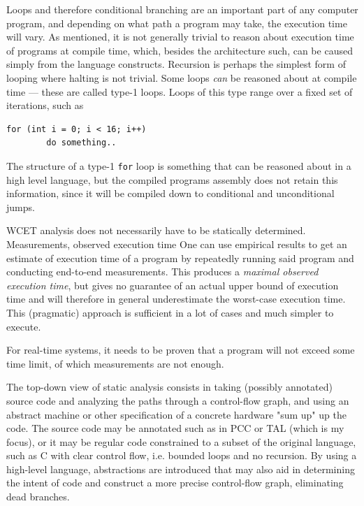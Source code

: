 Loops and therefore conditional branching are an important part of any computer
program, and depending on what path a program may take, the execution time will
vary.
As mentioned, it is not generally trivial to reason about execution time of
programs at compile time, which, besides the architecture such, can be caused
simply from the language constructs.
Recursion is perhaps the simplest form of looping where halting is not trivial.
Some loops \emph{can} be reasoned about at compile time --- these are called
type-1 loops\cite{pldi}.
Loops of this type range over a fixed set of iterations, such as
\begin{lstlisting}
for (int i = 0; i < 16; i++)
        do something..
\end{lstlisting}
The structure of a type-1 \texttt{for} loop is something that can be reasoned
about in a high level language, but the compiled programs assembly does not
retain this information, since it will be compiled down to conditional and
unconditional jumps.

WCET analysis does not necessarily have to be statically determined.
Measurements, observed execution time
One can use empirical results to get an estimate of execution time of a program
by repeatedly running said program and conducting end-to-end measurements.
This produces a \textit{maximal observed execution time}, but gives no
guarantee of an actual upper bound of execution time and will therefore in
general underestimate the worst-case execution time\cite{wcet}.
This (pragmatic) approach is sufficient in a lot of cases and much simpler to
execute.

For real-time systems, it needs to be proven that a program will not exceed
some time limit, of which measurements are not enough. 

The top-down view of static analysis consists in taking (possibly annotated)
source code and analyzing the paths through a control-flow graph, and using an
abstract machine or other specification of a concrete hardware "sum up" up the
code.
The source code may be annotated such as in PCC\cite{attpl} or
TAL\cite{tal-toplas} (which is my focus), or it may be regular code\cite{p10}
constrained to a subset of the original language, such as C with clear control
flow, i.e. bounded loops and no recursion.
By using a high-level language, abstractions are introduced that may also aid
in determining the intent of code and construct a more precise control-flow
graph, eliminating dead branches.



